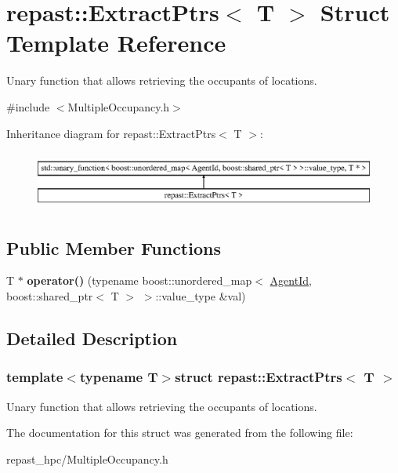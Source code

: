\hypertarget{structrepast_1_1_extract_ptrs}{\section{repast\-:\-:Extract\-Ptrs$<$ T $>$ Struct Template Reference}
\label{structrepast_1_1_extract_ptrs}
}


Unary function that allows retrieving the occupants of locations.  




{\ttfamily \#include $<$Multiple\-Occupancy.\-h$>$}

Inheritance diagram for repast\-:\-:Extract\-Ptrs$<$ T $>$\-:\begin{figure}[H]
\begin{center}
\leavevmode
\includegraphics[height=1.944445cm]{structrepast_1_1_extract_ptrs}
\end{center}
\end{figure}
\subsection*{Public Member Functions}
\begin{DoxyCompactItemize}
\item 
\hypertarget{structrepast_1_1_extract_ptrs_a5f865f44030fee1a36179d9121841b9d}{T $\ast$ {\bfseries operator()} (typename boost\-::unordered\-\_\-map$<$ \hyperlink{classrepast_1_1_agent_id}{Agent\-Id}, boost\-::shared\-\_\-ptr$<$ T $>$ $>$\-::value\-\_\-type \&val)}\label{structrepast_1_1_extract_ptrs_a5f865f44030fee1a36179d9121841b9d}

\end{DoxyCompactItemize}


\subsection{Detailed Description}
\subsubsection*{template$<$typename T$>$struct repast\-::\-Extract\-Ptrs$<$ T $>$}

Unary function that allows retrieving the occupants of locations. 

The documentation for this struct was generated from the following file\-:\begin{DoxyCompactItemize}
\item 
repast\-\_\-hpc/Multiple\-Occupancy.\-h\end{DoxyCompactItemize}
